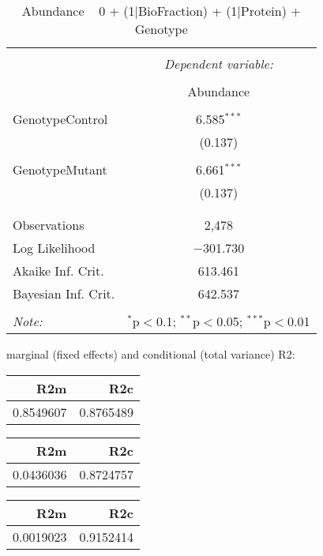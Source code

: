 \documentclass[11pt]{report}
\begin{document}
\begin{table}[!htbp] \centering 
  \caption{Abundance ~ 0 + (1|BioFraction) + (1|Protein) + Genotype} 
  \label{} 
\begin{tabular}{@{\extracolsep{5pt}}lc} 
\\[-1.8ex]\hline 
\hline \\[-1.8ex] 
 & \multicolumn{1}{c}{\textit{Dependent variable:}} \\ 
\cline{2-2} 
\\[-1.8ex] & Abundance \\ 
\hline \\[-1.8ex] 
 GenotypeControl & 6.585$^{***}$ \\ 
  & (0.137) \\ 
  & \\ 
 GenotypeMutant & 6.661$^{***}$ \\ 
  & (0.137) \\ 
  & \\ 
\hline \\[-1.8ex] 
Observations & 2,478 \\ 
Log Likelihood & $-$301.730 \\ 
Akaike Inf. Crit. & 613.461 \\ 
Bayesian Inf. Crit. & 642.537 \\ 
\hline 
\hline \\[-1.8ex] 
\textit{Note:}  & \multicolumn{1}{r}{$^{*}$p$<$0.1; $^{**}$p$<$0.05; $^{***}$p$<$0.01} \\ 
\end{tabular} 
\end{table} 
marginal (fixed effects) and conditional (total variance) R2:

\begin{tabular}{r|r}
\hline
R2m & R2c\\
\hline
0.8549607 & 0.8765489\\
\hline
\end{tabular}

\begin{tabular}{r|r}
\hline
R2m & R2c\\
\hline
0.0436036 & 0.8724757\\
\hline
\end{tabular}

\begin{tabular}{r|r}
\hline
R2m & R2c\\
\hline
0.0019023 & 0.9152414\\
\hline
\end{tabular}
\end{document}
